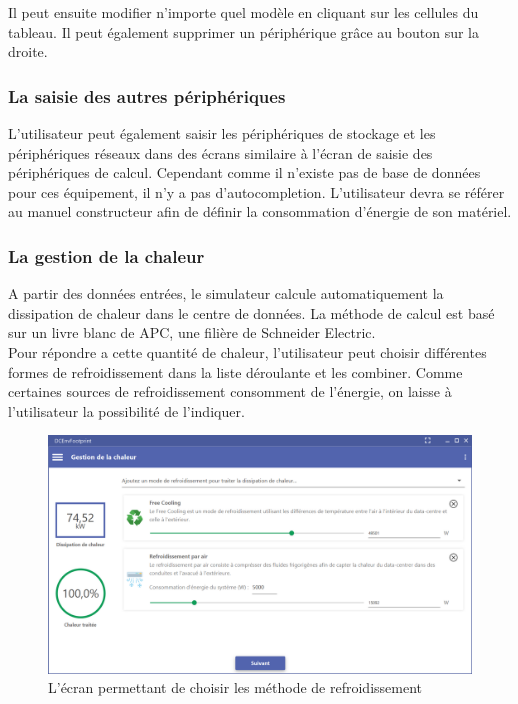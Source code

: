 Il peut ensuite modifier n'importe quel modèle en cliquant sur les cellules du tableau. Il peut également supprimer un périphérique grâce au bouton sur la droite.

\subsubsection{La saisie des autres périphériques}
L'utilisateur peut également saisir les périphériques de stockage et les périphériques réseaux dans des écrans similaire à l'écran de saisie des périphériques de calcul. Cependant comme il n'existe pas de base de données pour ces équipement, il n'y a pas d'autocompletion. L'utilisateur devra se référer au manuel constructeur afin de définir la consommation d'énergie de son matériel.

\subsubsection{La gestion de la chaleur}
A partir des données entrées, le simulateur calcule automatiquement la dissipation de chaleur dans le centre de données. La méthode de calcul est basé sur un livre blanc de APC, une filière de Schneider Electric.\\
Pour répondre a cette quantité de chaleur, l'utilisateur peut choisir différentes formes de refroidissement dans la liste déroulante et les combiner. Comme certaines sources de refroidissement consomment de l'énergie, on laisse à l'utilisateur la possibilité de l'indiquer.

\begin{figure}[h!]
	\begin{center}
		\includegraphics[scale=0.5]{partie3/images/chaleur.png}
		\caption{L'écran permettant de choisir les méthode de refroidissement}
	\end{center}
\end{figure}

